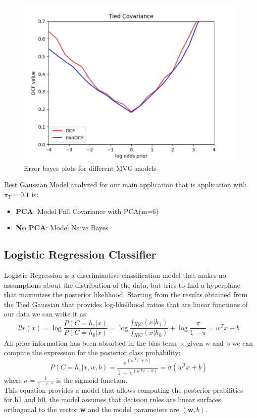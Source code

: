 \documentclass{article}
\begin{document}
\begin{figure}[H]
\begin{minipage}{.3\textwidth}
        \includegraphics[width=\linewidth]{./img/tied.png}
    \end{minipage}
    \caption{Error bayes plots for different MVG models} %
    \label{fig:models_comparison} %
\end{figure}
\underline{Best Gaussian Model} analyzed for our main application that is application with \(\pi_T=0.1\) is:
\begin{itemize}
    \item \textbf{PCA}: Model Full Covariance with PCA(m=6)
    \item \textbf{No PCA}: Model Naive Bayes 
\end{itemize}
\subsection{Logistic Regression Classifier}
Logistic Regression is a discriminative classification model that makes no assumptions about the distribution of the data, but tries to find a hyperplane that maximizes the posterior likelihood. 
Starting from the results obtained from the Tied Gaussian that provides log-likelihood ratios that are linear functions of our data we can write it as:
\begin{equation}
    llr(x) =\log{\frac{P(C=h_1|x)}{P(C=h_0|x)}}=\log{\frac{f_{X|C}(x|h_1)}{f_{X|C}(x|h_0)}}+\log{\frac{\pi}{1-\pi}}= w^Tx + b
\end{equation}
All prior information has been absorbed in the bias term b, given w and b we can compute the expression for the posterior class probability:
\begin{equation}
    P(C=h_1|x,w,b)=\frac{e^{(w^Tx+b)}}{1+e^{(w^Tx-b)}}=\sigma(w^Tx+b)
\end{equation}
where \(\sigma=\frac{1}{1-e^{-x}}\) is the sigmoid function.\\
This equation provides a model that allows computing the posterior prabilities for h1 and h0, the model assumes that decision rules are linear surfaces orthogonal to the vector \textbf{w} and the model parameters are \((\textbf{w},b)\).
\end{document}
